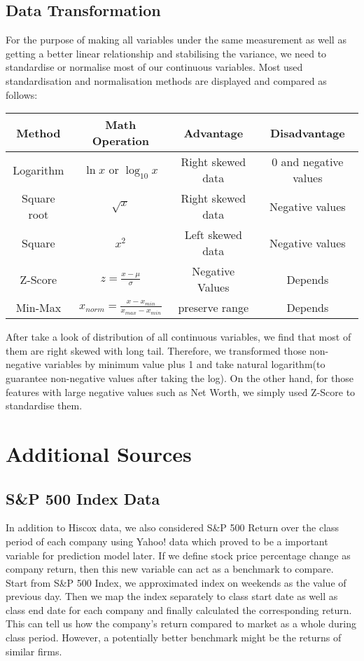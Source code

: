 \subsection{Data Transformation}
For the purpose of making all variables under the same measurement as well as getting a better linear relationship and stabilising the variance, we need to standardise or normalise most of our continuous variables. Most used standardisation and normalisation methods are displayed and compared as follows: 
\begin{table}[H]
\begin{center}
\begin{tabular}{|c|c|c|c|}
\hline
\rowcolor{Graylight}
Method & Math Operation & Advantage & Disadvantage\\
\hline
Logarithm  & $\ln{x}$ or $\log_{10}x$ & Right skewed data & 0 and negative values\\
\hline
\rowcolor{Gray}
Square root & $\sqrt{x}$ &  Right skewed data & Negative values\\
\hline
Square & $x^2$ & Left skewed data & Negative values\\
\hline
\rowcolor{Gray}
Z-Score & $z=\frac{x-\mu}{\sigma}$ & Negative Values & Depends\\
\hline
Min-Max & $x_{norm}=\frac{x-x_{min}}{x_{max}-x_{min}}$ & preserve range & Depends\\
\hline
\end{tabular}
\end{center}
\end{table}
After take a look of distribution of all continuous variables, we find that most of them are right skewed with long tail. Therefore, we transformed those non-negative variables by minimum value plus 1 and take natural logarithm(to guarantee non-negative values after taking the log). On the other hand, for those features with large negative values such as Net Worth, we simply used Z-Score to standardise them. 

\section{Additional Sources}
\subsection{S\&P 500 Index Data}
In addition to Hiscox data, we also considered S\&P 500 Return over the class period of each company using Yahoo! data which proved to be a important variable for prediction model later. If we define stock price percentage change as company return, then this new variable can act as a benchmark to compare. Start from S\&P 500 Index, we approximated index on weekends as the value of previous day. Then we map the index separately to class start date as well as class end date for each company and finally calculated the corresponding return. This can tell us how the company's return compared to market as a whole during class period. However, a potentially better benchmark might be the returns of similar firms. 
